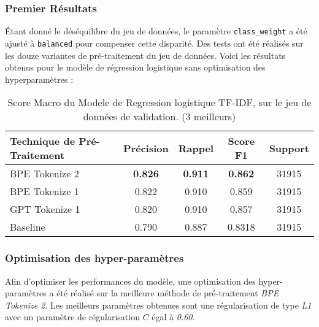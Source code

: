 \subsubsection{Premier Résultats}
Étant donné le déséquilibre du jeu de données, le paramètre \texttt{class\_weight} a été ajusté à \texttt{balanced} pour compenser cette disparité. 
Des tests ont été réalisés sur les douze variantes de pré-traitement du jeu de données.
Voici les résultats obtenus pour le modèle de régression logistique sans optimisation des hyperparamètres :

\begin{table}[ht]
    \centering
    \caption{Score Macro du Modele de Regression logistique TF-IDF, sur le jeu de données de validation. (3 meilleurs)}
    \begin{tabular}{lcccc}
    \hline
    \textbf{Technique de Pré-Traitement} & \textbf{Précision} & \textbf{Rappel} & \textbf{Score F1} & \textbf{Support} \\ \hline
    BPE Tokenize 2                       & \textbf{0.826}         & \textbf{0.911}         & \textbf{0.862}             & 31915            \\
    BPE Tokenize 1                           & 0.822              & 0.910                   & 0.859             & 31915            \\
    GPT Tokenize 1                              & 0.820              & 0.910                & 0.857             & 31915            \\ \hline
    Baseline                & 0.790              & 0.887           & 0.8318             & 31915            \\ \hline
    \end{tabular}
    \label{tab:results}
    \end{table}

\subsubsection{Optimisation des hyper-paramètres}
Afin d'optimiser les performances du modèle, une optimisation des hyper-paramètres a été réalisé sur la meilleure méthode de pré-traitement \textit{BPE Tokenize 2}. 
Les meilleurs paramètres obtenues sont une régularisation de type \textit{L1} avec un paramètre de régularisation $C$ égal à \textit{0.60}.

